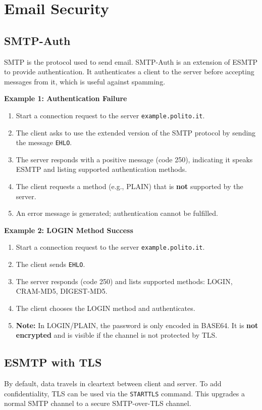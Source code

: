 \chapter{Email Security}

\section{SMTP-Auth}
SMTP is the protocol used to send email. SMTP-Auth is an extension of ESMTP to provide authentication. It authenticates a client to the server before accepting messages from it, which is useful against spamming.

\textbf{Example 1: Authentication Failure}
\begin{enumerate}
    \item Start a connection request to the server \texttt{example.polito.it}.
    \item The client asks to use the extended version of the SMTP protocol by sending the message \texttt{EHLO}.
    \item The server responds with a positive message (code 250), indicating it speaks ESMTP and listing supported authentication methods.
    \item The client requests a method (e.g., PLAIN) that is \textbf{not} supported by the server.
    \item An error message is generated; authentication cannot be fulfilled.
\end{enumerate}

\textbf{Example 2: LOGIN Method Success}
\begin{enumerate}
    \item Start a connection request to the server \texttt{example.polito.it}.
    \item The client sends \texttt{EHLO}.
    \item The server responds (code 250) and lists supported methods: LOGIN, CRAM-MD5, DIGEST-MD5.
    \item The client chooses the LOGIN method and authenticates.
    \item \textbf{Note:} In LOGIN/PLAIN, the password is only encoded in BASE64. It is \textbf{not encrypted} and is visible if the channel is not protected by TLS.
\end{enumerate}

\section{ESMTP with TLS}
By default, data travels in cleartext between client and server. To add confidentiality, TLS can be used via the \texttt{STARTTLS} command. This upgrades a normal SMTP channel to a secure SMTP-over-TLS channel.

